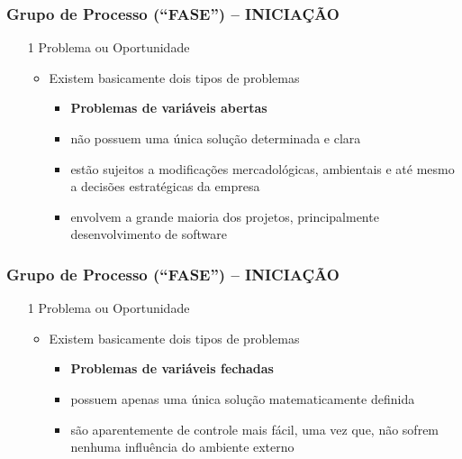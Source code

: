 \begin{frame}
   \frametitle{Grupo de Processo (“FASE”) – INICIAÇÃO}
   \begin{itemize}
     \item[1] Problema ou Oportunidade
    \begin{itemize}
     \item Existem basicamente dois tipos de problemas
     \begin{itemize}
      \item \textbf{Problemas de variáveis abertas}
       \item não possuem uma única solução determinada e clara
       \item estão sujeitos a modificações mercadológicas, ambientais e até mesmo a decisões estratégicas da empresa
       \item envolvem a grande maioria dos projetos, principalmente desenvolvimento de software
     \end{itemize}
    \end{itemize}
   \end{itemize}
\end{frame}

\begin{frame}
   \frametitle{Grupo de Processo (“FASE”) – INICIAÇÃO}
   \begin{itemize}
     \item[1] Problema ou Oportunidade
    \begin{itemize}
     \item Existem basicamente dois tipos de problemas
     \begin{itemize}
      \item \textbf{Problemas de variáveis fechadas}
       \item possuem apenas uma única solução matematicamente definida
       \item são aparentemente de controle mais fácil, uma vez que, não sofrem nenhuma influência do ambiente externo
     \end{itemize}
    \end{itemize}
   \end{itemize}
\end{frame}

